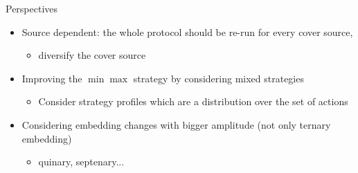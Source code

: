 \documentclass[10pt,aspectratio=169]{beamer}
\begin{document}
\begin{frame}{Perspectives}
  
    \begin{itemize}
        \setlength\itemsep{2em}
    
        \item Source dependent: the whole protocol should be re-run for every cover source,  
                
            \begin{itemize}
                \item diversify the cover source
            \end{itemize}
            
        \pause 
        
        \item Improving the $\min\max$ strategy by considering mixed strategies
            \begin{itemize}
                \item Consider strategy profiles which are a distribution over the set of actions
            \end{itemize}

        \item Considering embedding changes with bigger amplitude (not only ternary embedding)
            \begin{itemize}
                \item quinary, septenary...
            \end{itemize}

    
    \end{itemize}

\end{frame}


%
%
\end{document}
